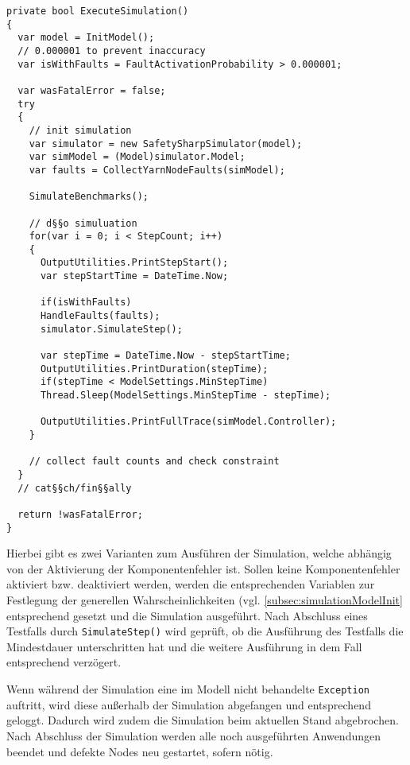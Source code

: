 \begin{lstlisting}[label=lst:hadoopSimulation,style=cs,
caption={[Durchführung der Simulation]
    Durchführung der Simulation (gekürzt).}]
private bool ExecuteSimulation()
{
  var model = InitModel();
  // 0.000001 to prevent inaccuracy
  var isWithFaults = FaultActivationProbability > 0.000001;
  
  var wasFatalError = false;
  try
  {
    // init simulation
    var simulator = new SafetySharpSimulator(model);
    var simModel = (Model)simulator.Model;
    var faults = CollectYarnNodeFaults(simModel);
    
    SimulateBenchmarks();
    
    // d§§o simuluation
    for(var i = 0; i < StepCount; i++)
    {
      OutputUtilities.PrintStepStart();
      var stepStartTime = DateTime.Now;
      
      if(isWithFaults)
      HandleFaults(faults);
      simulator.SimulateStep();
      
      var stepTime = DateTime.Now - stepStartTime;
      OutputUtilities.PrintDuration(stepTime);
      if(stepTime < ModelSettings.MinStepTime)
      Thread.Sleep(ModelSettings.MinStepTime - stepTime);
      
      OutputUtilities.PrintFullTrace(simModel.Controller);
    }
    
    // collect fault counts and check constraint
  }
  // cat§§ch/fin§§ally
  
  return !wasFatalError;
}
\end{lstlisting}

Hierbei gibt es zwei Varianten zum Ausführen der Simulation, welche abhängig von der Aktivierung der Komponentenfehler ist.
Sollen keine Komponentenfehler aktiviert bzw. deaktiviert werden, werden die entsprechenden Variablen zur Festlegung der generellen Wahrscheinlichkeiten (vgl. \cref{subsec:simulationModelInit} entsprechend gesetzt und die Simulation ausgeführt.
Nach Abschluss eines Testfalls durch \texttt{SimulateStep()} wird geprüft, ob die Ausführung des Testfalls die Mindestdauer unterschritten hat und die weitere Ausführung in dem Fall entsprechend verzögert.

Wenn während der Simulation eine im Modell nicht behandelte \texttt{Exception} auftritt, wird diese außerhalb der Simulation abgefangen und entsprechend geloggt.
Dadurch wird zudem die Simulation beim aktuellen Stand abgebrochen.
Nach Abschluss der Simulation werden alle noch ausgeführten Anwendungen beendet und defekte Nodes neu gestartet, sofern nötig.

